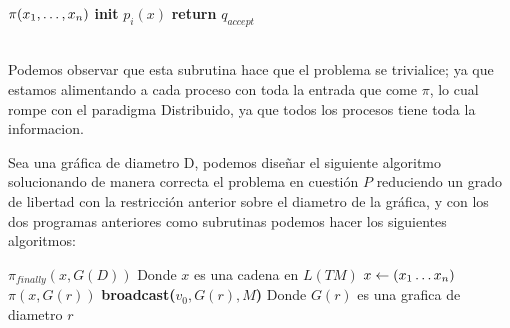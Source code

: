 \documentclass[11pt]{article}
\begin{document}
    \begin{algorithm}
        \begin{algorithmic}
            \STATE $\pi(x_{1},\mathellipsis, x_{n})$
            \STATE \textbf{init} $p_{i}(x)$
               \STATE \textbf{return} $q_{accept}$
            \ENDFOR
        \end{algorithmic}
        \caption{$\pi(x,G)$\label{lss}}
    \end{algorithm}
    \\

    Podemos observar que esta subrutina hace que el problema se trivialice;
    ya que estamos alimentando a cada proceso con toda la entrada que come
    $\pi$, lo cual rompe con el paradigma Distribuido, ya que todos los procesos
    tiene toda la informacion.


    Sea una gráfica de diametro D, podemos diseñar el siguiente algoritmo
    solucionando de manera correcta el problema en cuestión $P$ reduciendo
    un grado de libertad con la restricción anterior sobre el diametro de
    la gráfica, y con los dos programas anteriores como subrutinas podemos
    hacer los siguientes algoritmos:

    \begin{algorithm}
        \begin{algorithmic}
            \STATE $\pi_{finally}(x, G(D))$
            \STATE Donde $x$ es una cadena en $L(TM)$
            \STATE $x \leftarrow (x_{1}\mathellipsis x_{n})$
               \STATE $\pi(x, G(r))$
               \STATE \textbf{broadcast($v_{0},G(r), M$)}
               \STATE Donde $G(r)$ es una grafica de diametro $r$
            \ENDFOR
        \end{algorithmic}
        \caption{$\pi(x,G)$\label{lss}}
    \end{algorithm}
\end{document}
